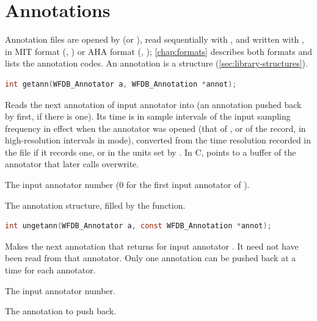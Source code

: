 \section{Annotations}
\label{sec:library-annotations}

Annotation files are opened by  (or ), read
sequentially with , and written with , in MIT
format (, ) or AHA format
(, ); \cref{chap:formats}
describes both formats and lists the annotation codes. An annotation is a
 structure (\cref{sec:library-structures}).

\begin{lstlisting}[language=C,style=signature]
int getann(WFDB_Annotator a, WFDB_Annotation *annot);
\end{lstlisting}
Reads the next annotation of input annotator  into  (an
annotation pushed back by  first, if there is one). Its time
is in sample intervals of the input sampling frequency in effect when the
annotator was opened (that of , or of the record, in
high-resolution intervals in  mode), converted from the
time resolution recorded in the file if it records one, or in the units set by
. In C,  points to a buffer of the annotator that
later calls overwrite.
\begin{params}
\item[a] The input annotator number (0 for the first input annotator of
  ).
\item[annot] The annotation structure, filled by the function.
\end{params}

\begin{lstlisting}[language=C,style=signature]
int ungetann(WFDB_Annotator a, const WFDB_Annotation *annot);
\end{lstlisting}
Makes  the next annotation that  returns for input
annotator . It need not have been read from that annotator. Only one
annotation can be pushed back at a time for each annotator.
\begin{params}
\item[a] The input annotator number.
\item[annot] The annotation to push back.
\end{params}

